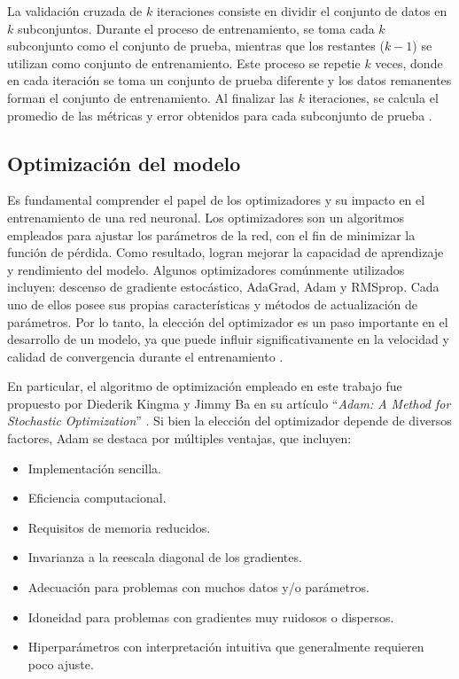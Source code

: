 
La validación cruzada de $k$ iteraciones consiste en dividir el conjunto de datos en $k$ subconjuntos. Durante 
el proceso de entrenamiento, se toma cada $k$ subconjunto como el conjunto de prueba, mientras que los 
restantes ($k-1$) se utilizan como conjunto de entrenamiento. Este proceso se repetie $k$ veces, donde 
en cada iteración se toma un conjunto de prueba diferente y los datos remanentes forman el conjunto 
de entrenamiento. Al finalizar las $k$ iteraciones, se calcula el promedio de las métricas y error 
obtenidos para cada subconjunto de prueba \citep{CITE:48}.

\subsection{Optimización del modelo}
Es fundamental comprender el papel de los optimizadores y su impacto en el entrenamiento de una red neuronal. 
Los optimizadores son un algoritmos empleados para ajustar los parámetros de la red, con el fin de minimizar 
la función de pérdida. Como resultado, logran mejorar la capacidad de aprendizaje y rendimiento del modelo. 
Algunos optimizadores comúnmente utilizados incluyen: descenso de gradiente estocástico, AdaGrad, Adam y RMSprop. 
Cada uno de ellos posee sus propias características y métodos de actualización de parámetros. Por lo tanto, 
la elección del optimizador es un paso importante en el desarrollo de un modelo, ya que puede influir 
significativamente en la velocidad y calidad de convergencia durante el entrenamiento \citep{CITE:44}.

En particular, el algoritmo de optimización empleado en este trabajo fue propuesto por 
Diederik Kingma y Jimmy Ba en su artículo ``\emph{Adam: A Method for Stochastic Optimization}'' \citep{CITE:49}. Si bien 
la elección del optimizador depende de diversos factores, Adam se destaca por múltiples ventajas, que incluyen:

\begin{itemize}
	\item Implementación sencilla.
	\item Eficiencia computacional.
	\item Requisitos de memoria reducidos.
	\item Invarianza a la reescala diagonal de los gradientes.
	\item Adecuación para problemas con muchos datos y/o parámetros.
	\item Idoneidad para problemas con gradientes muy ruidosos o dispersos.
	\item Hiperparámetros con interpretación intuitiva que generalmente requieren poco ajuste.
\end{itemize}


